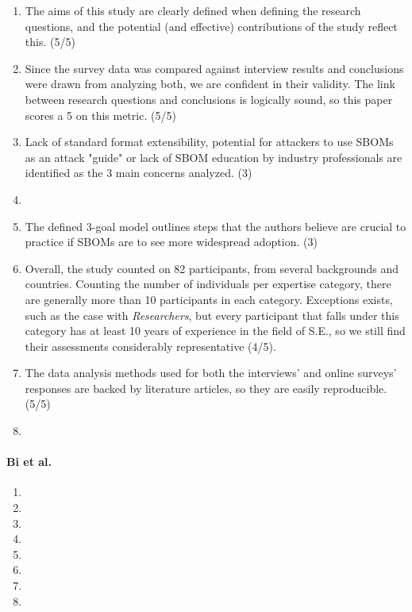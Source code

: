 \begin{enumerate}
    \item The aims of this study are clearly defined when defining the research questions, and the potential (and effective) contributions of the study reflect this. (5/5)
    \item Since the survey data was compared against interview results and conclusions were drawn from analyzing both, we are confident in their validity. The link between research questions and conclusions is logically sound, so this paper scores a 5 on this metric. (5/5)
    \item Lack of standard format extensibility, potential for attackers to use SBOMs as an attack "guide" or lack of SBOM education by industry professionals are identified as the 3 main concerns analyzed. (3)
    \item
    \item The defined 3-goal model outlines steps that the authors believe are crucial to practice if SBOMs are to see more widespread adoption. (3)
    \item Overall, the study counted on 82 participants, from several backgrounds and countries. Counting the number of individuals per expertise category, there are generally more than 10 participants in each category. Exceptions exists, such as the case with \emph{Researchers}, but every participant that falls under this category has at least 10 years of experience in the field of S.E., so we still find their assessments considerably representative (4/5).
    \item The data analysis methods used for both the interviews' and online surveys' responses are backed by literature articles, so they are easily reproducible. (5/5)
    \item
\end{enumerate}

\paragraph{Bi et al. \cite{article:sboms-issues-solutions}}

\begin{enumerate}
    \item
    \item
    \item
    \item
    \item
    \item
    \item
    \item
\end{enumerate}

